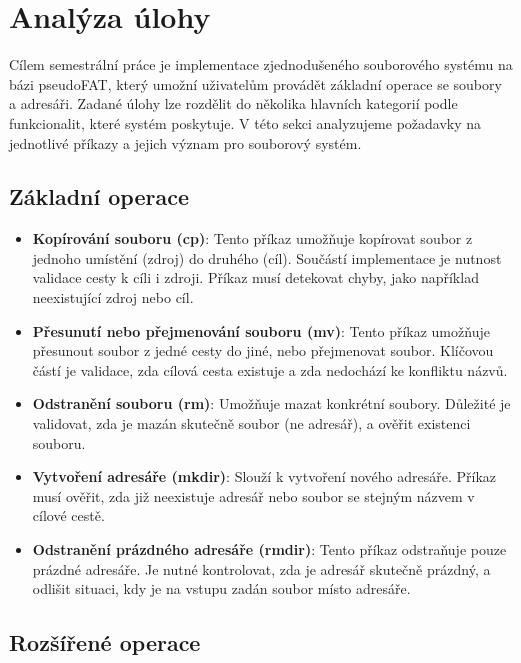 \documentclass[12pt, a4paper]{article}
\begin{document}
\section{Analýza úlohy}

Cílem semestrální práce je implementace zjednodušeného souborového systému na bázi pseudoFAT, který umožní uživatelům provádět základní operace se soubory a adresáři. Zadané úlohy lze rozdělit do několika hlavních kategorií podle funkcionalit, které systém poskytuje. V této sekci analyzujeme požadavky na jednotlivé příkazy a jejich význam pro souborový systém.

\subsection{Základní operace}

\begin{itemize}
    \item \textbf{Kopírování souboru (cp)}: Tento příkaz umožňuje kopírovat soubor z jednoho umístění (zdroj) do druhého (cíl). Součástí implementace je nutnost validace cesty k cíli i zdroji. Příkaz musí detekovat chyby, jako například neexistující zdroj nebo cíl.
    
    \item \textbf{Přesunutí nebo přejmenování souboru (mv)}: Tento příkaz umožňuje přesunout soubor z jedné cesty do jiné, nebo přejmenovat soubor. Klíčovou částí je validace, zda cílová cesta existuje a zda nedochází ke konfliktu názvů.
    
    \item \textbf{Odstranění souboru (rm)}: Umožňuje mazat konkrétní soubory. Důležité je validovat, zda je mazán skutečně soubor (ne adresář), a ověřit existenci souboru.
    
    \item \textbf{Vytvoření adresáře (mkdir)}: Slouží k vytvoření nového adresáře. Příkaz musí ověřit, zda již neexistuje adresář nebo soubor se stejným názvem v cílové cestě.
    
    \item \textbf{Odstranění prázdného adresáře (rmdir)}: Tento příkaz odstraňuje pouze prázdné adresáře. Je nutné kontrolovat, zda je adresář skutečně prázdný, a odlišit situaci, kdy je na vstupu zadán soubor místo adresáře.
\end{itemize}

\subsection{Rozšířené operace}
\end{document}
